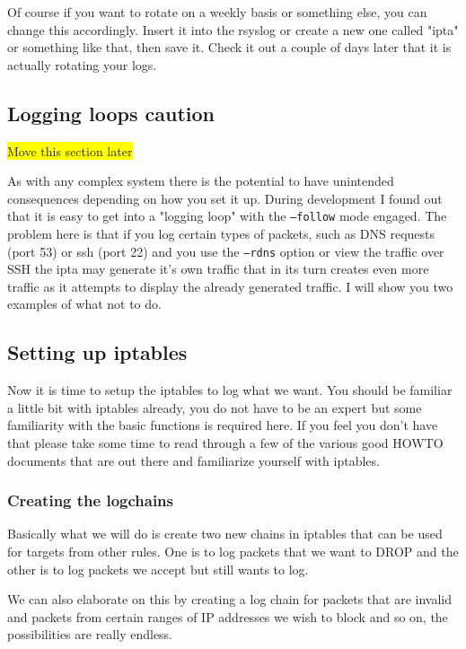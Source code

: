 \documentclass[english,twoside,openright,a4paper,12pt]{article}
\newcommand{\hilight}[1]{\colorbox{yellow}{#1}}
\begin{document}
Of course if you want to rotate on a weekly basis or something else,
you can change this accordingly. Insert it into the rsyslog or create
a new one called "ipta" or something like that, then save it. Check
it out a couple of days later that it is actually rotating your logs.

\subsection{Logging loops caution}
\hilight{Move this section later}

As with any complex system there is the potential to have unintended
consequences depending on how you set it up. During development I
found out that it is easy to get into a "logging loop" with the
\texttt{--follow} mode engaged. The problem here is that if you log
certain types of packets, such as DNS requests (port 53) or ssh (port
22) and you use the \texttt{--rdns} option or view the traffic over
SSH the ipta may generate it's own traffic that in its turn creates
even more traffic as it attempts to display the already generated
traffic. I will show you two examples of what not to do.

\subsection{Setting up iptables}

Now it is time to setup the iptables to log what we want. You should
be familiar a little bit with iptables already, you do not have to be
an expert but some familiarity with the basic functions is required
here. If you feel you don't have that please take some time to read
through a few of the various good HOWTO documents that are out there
and familiarize yourself with iptables.

\subsubsection{Creating the logchains}

Basically what we will do is create two new chains in iptables that
can be used for targets from other rules. One is to log packets that
we want to DROP and the other is to log packets we accept but still
wants to log.

We can also elaborate on this by creating a log chain for packets that
are invalid and packets from certain ranges of IP addresses we wish to
block and so on, the possibilities are really endless.
\end{document}
